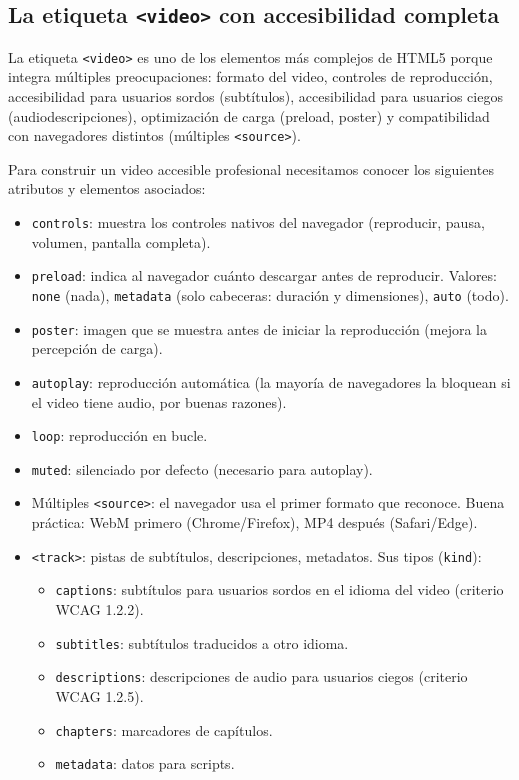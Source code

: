 \documentclass[11pt,a4paper,openany]{book}
\begin{document}
\subsection{La etiqueta \texttt{<video>} con accesibilidad completa}

La etiqueta \texttt{<video>} es uno de los elementos más complejos
de HTML5 porque integra múltiples preocupaciones: formato del video,
controles de reproducción, accesibilidad para usuarios sordos
(subtítulos), accesibilidad para usuarios ciegos (audiodescripciones),
optimización de carga (preload, poster) y compatibilidad con navegadores
distintos (múltiples \texttt{<source>}).

Para construir un video accesible profesional necesitamos conocer
los siguientes atributos y elementos asociados:

\begin{itemize}
\item \texttt{controls}: muestra los controles nativos del navegador
(reproducir, pausa, volumen, pantalla completa).
\item \texttt{preload}: indica al navegador cuánto descargar antes de
reproducir. Valores: \texttt{none} (nada), \texttt{metadata}
(solo cabeceras: duración y dimensiones), \texttt{auto} (todo).
\item \texttt{poster}: imagen que se muestra antes de iniciar la
reproducción (mejora la percepción de carga).
\item \texttt{autoplay}: reproducción automática (la mayoría de
navegadores la bloquean si el video tiene audio, por buenas
razones).
\item \texttt{loop}: reproducción en bucle.
\item \texttt{muted}: silenciado por defecto (necesario para
autoplay).
\item Múltiples \texttt{<source>}: el navegador usa el primer formato
que reconoce. Buena práctica: WebM primero (Chrome/Firefox), MP4
después (Safari/Edge).
\item \texttt{<track>}: pistas de subtítulos, descripciones,
metadatos. Sus tipos (\texttt{kind}):
   \begin{itemize}
   \item \texttt{captions}: subtítulos para usuarios sordos en el
   idioma del video (criterio WCAG 1.2.2).
   \item \texttt{subtitles}: subtítulos traducidos a otro idioma.
   \item \texttt{descriptions}: descripciones de audio para usuarios
   ciegos (criterio WCAG 1.2.5).
   \item \texttt{chapters}: marcadores de capítulos.
   \item \texttt{metadata}: datos para scripts.
   \end{itemize}
\end{itemize}
\end{document}
